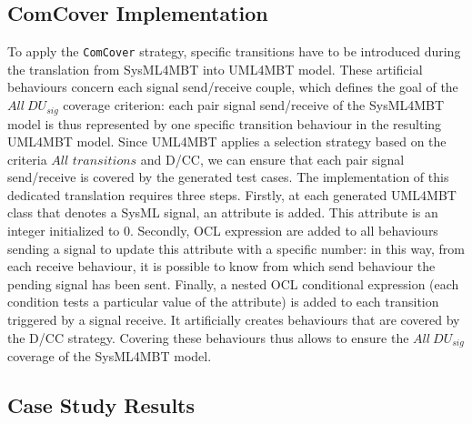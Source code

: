 \documentclass{llncs}
\begin{document}
\subsection{ComCover Implementation}
\vspace*{-.15cm}
To apply the \texttt{ComCover} strategy, specific transitions
have to be introduced during the translation from
SysML4MBT into UML4MBT model. These artificial behaviours concern each
signal send/receive couple, which defines the goal of the $All~DU_{sig}$
coverage criterion: each pair signal send/receive of the SysML4MBT
model is thus represented by one specific transition behaviour in the resulting
UML4MBT model. Since UML4MBT applies a selection strategy
based on the criteria $All$ $transitions$ and D/CC, we can ensure that
each pair signal send/receive is covered by the generated test cases. 
The implementation of this dedicated translation requires three steps. 
Firstly, at each generated UML4MBT class that denotes a SysML signal, 
an attribute is added. This attribute is an integer initialized to 0. 
Secondly, OCL expression are added to all behaviours sending a signal 
to update this attribute with a specific number: in this way, from
each receive behaviour, it is possible to know from which send behaviour 
the pending signal has been sent. Finally, a nested OCL conditional expression (each condition tests a particular value of the attribute) is added to each transition triggered by a signal receive. It artificially creates behaviours that are covered by the D/CC strategy. Covering these behaviours thus allows to ensure the $All~DU_{sig}$ coverage of the SysML4MBT model.  

\vspace*{-.25cm}
\subsection{Case Study Results}
\label{result}
\vspace*{-.15cm}
\end{document}
